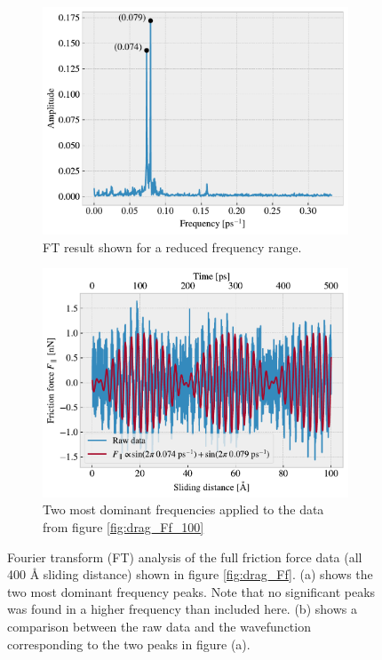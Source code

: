 \begin{figure}[H]
  \centering
  \begin{subfigure}[t]{0.49\textwidth}
    \centering
    \includegraphics[width=\textwidth]{figures/baseline/ft_zoom.pdf}
    \caption{FT result shown for a reduced frequency range.}
    \label{fig:ft_a}
  \end{subfigure}
  \hfill
  \begin{subfigure}[t]{0.49\textwidth}
      \centering
      \includegraphics[width=\textwidth]{figures/baseline/ft_sine.pdf}
      \caption{Two most dominant frequencies applied to the data from figure \ref{fig:drag_Ff_100}}
      \label{fig:ft_b}
  \end{subfigure}
  \caption{Fourier transform (FT) analysis of the full friction force data (all 400 Å sliding distance) shown in figure \ref{fig:drag_Ff}. (a) shows the two most dominant frequency peaks. Note that no significant peaks was found in a higher frequency than included here. (b) shows a comparison between the raw data and the wavefunction corresponding to the two peaks in figure (a).}
  \label{fig:ft}
\end{figure}


